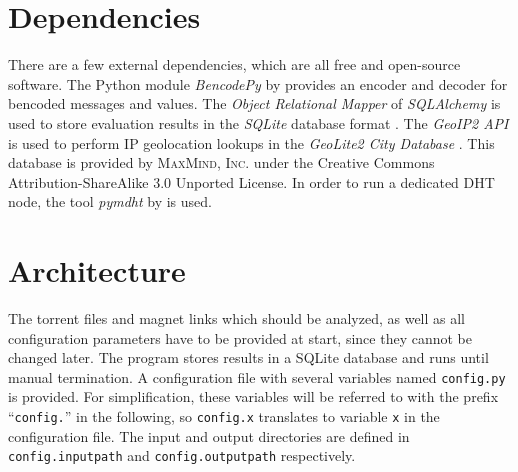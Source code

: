 \documentclass[10pt, a4paper, twoside, headsepline]{scrbook}
\renewcommand{\_}{\origunderscore\allowbreak}
\newcommand{\config}[1]{\texttt{config.\allowbreak #1}}
\begin{document}
\section{Dependencies}
\label{dep}
There are a few external dependencies, which are all free and open-source software. The Python module \emph{BencodePy} by \textcite{bencodepy} provides an encoder and decoder for bencoded messages and values. The \emph{Object Relational Mapper} of \emph{SQLAlchemy} \cite{sqlalchemy} is used to store evaluation results in the \emph{SQLite} database format \cite{sqlite}. The \emph{GeoIP2 API} \cite{geoip2-api} is used to perform IP geolocation lookups in the \emph{GeoLite2 City Database} \cite{geolite2-db}. This database is provided by \textsc{MaxMind, Inc.} under the Creative Commons Attribution-ShareAlike 3.0 Unported License. In order to run a dedicated DHT node, the tool \emph{pymdht} by \textcite{pymdht} is used.

\section{Architecture}
The torrent files and magnet links which should be analyzed, as well as all configuration parameters have to be provided at start, since they cannot be changed later. The program stores results in a SQLite database and runs until manual termination. A configuration file with several variables named \texttt{config.py} is provided. For simplification, these variables will be referred to with the prefix ``\texttt{config.}'' in the following, so \config{x} translates to variable \texttt{x} in the configuration file. The input and output directories are defined in \config{input\_path} and \config{output\_path} respectively.
\end{document}
